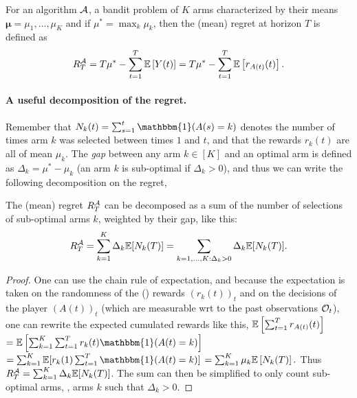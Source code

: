 \begin{defn}[Regret]\label{def:2:regret}
    For an algorithm $\mathcal{A}$, a bandit problem of $K$ arms characterized by their means $\bm{\mu} = \mu_1,\dots,\mu_K$ and if $\mu^* = \max_k \mu_k$, then the (mean) regret at horizon $T$ is defined as
    \begin{equation}
        R_T^{\mathcal{A}} = T \mu^* - \sum_{t=1}^T \mathbb{E}\left[ Y(t) \right] = T \mu^* - \sum_{t=1}^T \mathbb{E}\left[ r_{A(t)}(t) \right].
    \end{equation}
\end{defn}


\paragraph{A useful decomposition of the regret.}
%
Remember that $N_k(t) = \sum_{s=1}^t \mathbbm{1}(A(s) = k)$ denotes the number of times arm $k$ was selected between times $1$ and $t$,
%
and that the rewards $r_k(t)$ are all \iid{} of mean $\mu_k$.
The \emph{gap} between any arm $k\in[K]$ and an optimal arm is defined as $\Delta_k = \mu^* - \mu_k$
(an arm $k$ is sub-optimal if $\Delta_k > 0$),
and thus we can write the following decomposition on the regret,

\begin{lemma}\label{lem:2:RegretDecomposition}
    The (mean) regret $R_T^{\mathcal{A}}$ can be decomposed as a sum of the number of selections of sub-optimal arms $k$,
    weighted by their gap, like this:
    \begin{equation}\label{eq:2:RegretDecomposition}
        R_T^{\mathcal{A}} = \sum_{k=1}^K \Delta_k \mathbb{E}[ N_k(T) ] = \sum_{k=1,\dots,K : \Delta_k > 0} \Delta_k \mathbb{E}[ N_k(T) ].
    \end{equation}
\end{lemma}
%
\begin{proof}\label{proof:2:RegretDecomposition}
    One can use the chain rule of expectation, and because the expectation is taken on the randomness of the (\iid) rewards $(r_k(t))_t$ and on the decisions of the player $(A(t))_t$ (which are measurable wrt to the past observations $\mathcal{O}_t$),
    one can rewrite the expected cumulated rewards like this,
    $\mathbb{E} \left[ \sum_{t=1}^T r_{A(t)}(t) \right]$
    $= \E \left[ \sum_{k=1}^K \sum_{t=1}^T r_k(t) \mathbbm{1}(A(t) = k) \right]$
    $= \sum_{k=1}^K \E [ r_k(1) \sum_{t=1}^T \mathbbm{1}(A(t) = k) ]$
    $= \sum_{k=1}^K \mu_k \mathbb{E} \left[ N_k(T) \right].$
    Thus $R_T^{\mathcal{A}} = \sum_{k=1}^K \Delta_k \mathbb{E}[ N_k(T) ]$.
    The sum can then be simplified to only count sub-optimal arms, \ie, arms $k$ such that $\Delta_k > 0$.
\end{proof}


